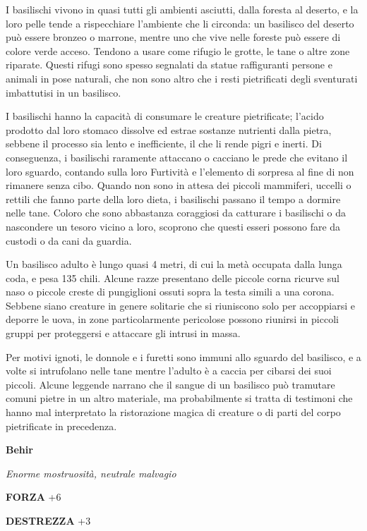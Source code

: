 \begin{multicols}{2}
	I basilischi vivono in quasi tutti gli ambienti asciutti, dalla foresta al deserto, e la loro pelle tende a rispecchiare l'ambiente che li circonda: un basilisco del deserto può essere bronzeo o marrone, mentre uno che vive nelle foreste può essere di colore verde acceso. Tendono a usare come rifugio le grotte, le tane o altre zone riparate. Questi rifugi sono spesso segnalati da statue raffiguranti persone e animali in pose naturali, che non sono altro che i resti pietrificati degli sventurati imbattutisi in un basilisco.

	I basilischi hanno la capacità di consumare le creature pietrificate; l'acido prodotto dal loro stomaco dissolve ed estrae sostanze nutrienti dalla pietra, sebbene il processo sia lento e inefficiente, il che li rende pigri e inerti. Di conseguenza, i basilischi raramente attaccano o cacciano le prede che evitano il loro sguardo, contando sulla loro Furtività e l'elemento di sorpresa al fine di non rimanere senza cibo. Quando non sono in attesa dei piccoli mammiferi, uccelli o rettili che fanno parte della loro dieta, i basilischi passano il tempo a dormire nelle tane. Coloro che sono abbastanza coraggiosi da catturare i basilischi o da nascondere un tesoro vicino a loro, scoprono che questi esseri possono fare da custodi o da cani da guardia.

	Un basilisco adulto è lungo quasi 4 metri, di cui la metà occupata dalla lunga coda, e pesa 135 chili. Alcune razze presentano delle piccole corna ricurve sul naso o piccole creste di pungiglioni ossuti sopra la testa simili a una corona. Sebbene siano creature in genere solitarie che si riuniscono solo per accoppiarsi e deporre le uova, in zone particolarmente pericolose possono riunirsi in piccoli gruppi per proteggersi e attaccare gli intrusi in massa.

	Per motivi ignoti, le donnole e i furetti sono immuni allo sguardo del basilisco, e a volte si intrufolano nelle tane mentre l'adulto è a caccia per cibarsi dei suoi piccoli. Alcune leggende narrano che il sangue di un basilisco può tramutare comuni pietre in un altro materiale, ma probabilmente si tratta di testimoni che hanno mal interpretato la ristorazione magica di creature o di parti del corpo pietrificate in precedenza.

	\medskip{}\textbf{Behir}

	\textit{Enorme mostruosità, neutrale malvagio}

	\textbf{FORZA} +6

	\textbf{DESTREZZA} +3


\end{multicols}
